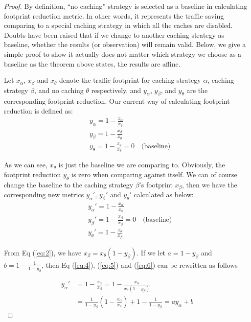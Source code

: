 \documentclass{sigcomm-alternate}
\begin{document}
\begin{proof}
By definition, ``no caching'' strategy is selected as
a baseline in calculating footprint reduction metric. In other words, it
represents the traffic saving comparing to a special caching strategy
in which all the caches are disabled. Doubts have been raised that if
we change to another caching strategy as baseline, whether the results
(or observation) will remain valid. Below, we give a simple proof to
show it actually does not matter which strategy we choose as a
baseline as the theorem above states, the results are affine.

Let $x_{\alpha}$, $x_{\beta}$ and $x_{\theta}$ denote the traffic
footprint for caching strategy $\alpha$, caching strategy $\beta$, and
no caching $\theta$ respectively, and $y_{\alpha}$, $y_{\beta}$, and
$y_{\theta}$ are the corresponding footprint reduction. Our current
way of calculating footprint reduction is defined as:
\begin{align}
  & y_{\alpha} = 1 - \frac{x_{\alpha}}{x_{\theta}} \label{eq:1}\\
  & y_{\beta} = 1 - \frac{x_{\beta}}{x_{\theta}}  \label{eq:2} \\
  & y_{\theta} = 1 - \frac{x_{\theta}}{x_{\theta}} = 0 \quad
  \text{(baseline)} \label{eq:3}
\end{align}

As we can see, $x_{\theta}$ is just the baseline we are comparing
to. Obviously, the footprint reduction $y_{\theta}$ is zero when
comparing against itself. We can of course change the baseline to the
caching strategy $\beta$'s footprint $x_{\beta}$, then we have the
corresponding new metrics $y_{\alpha}'$, $y_{\beta}'$ and
$y_{\theta}'$ calculated as below:
\begin{align}
  & y_{\alpha}' = 1 - \frac{x_{\alpha}}{x_{\beta}} \label{eq:4} \\
  & y_{\beta}' = 1 - \frac{x_{\beta}}{x_{\beta}} = 0 \quad \text{(baseline)} \label{eq:5} \\
  & y_{\theta}' = 1 - \frac{x_{\theta}}{x_{\beta}} \label{eq:6}
\end{align}

From Eq (\ref{eq:2}), we have $x_{\beta} = x_{\theta}(1 -
y_{\beta})$. If we let $a = 1 - y_{\beta}$ and $b = 1 -
\frac{1}{1-y_{\beta}}$, then Eq (\ref{eq:4}), (\ref{eq:5}) and
(\ref{eq:6}) can be rewritten as follows

\begin{align}
  y_{\alpha}' & = 1 - \frac{x_{\alpha}}{x_{\beta}} = 1 - \frac{x_{\alpha}}{x_{\theta}(1 - y_{\beta})} \\ 
  & = \frac{1}{1-y_{\beta}} (1 - \frac{x_{\alpha}}{x_{\theta}}) + 1 - \frac{1}{1-y_{\beta}} = a y_{\alpha} + b \label{eq:7}
\end{align}


\end{proof}
\end{document}
